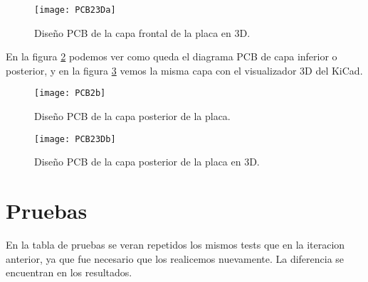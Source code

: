 \begin{figure}  [H]
\centering
  \texttt{[image: PCB23Da]}
  \caption{Diseño PCB de la capa frontal de la placa en 3D.}\label{fig:PCB23Da}
\end{figure}

En la figura \ref{fig:PCB2b} podemos ver como queda el diagrama PCB de capa inferior o posterior, y en la figura \ref{fig:PCB23Db} vemos la misma capa con el visualizador 3D del KiCad.

\begin{figure}[H] 
\centering
  \texttt{[image: PCB2b]}
  \caption{Diseño PCB de la capa posterior de la placa.}\label{fig:PCB2b}
\end{figure}

\begin{figure}  [H]
\centering
  \texttt{[image: PCB23Db]}
  \caption{Diseño PCB de la capa posterior de la placa en 3D.}\label{fig:PCB23Db}
\end{figure}



\section{Pruebas} %
\label{sec:pruebas}

En la tabla de pruebas se veran repetidos los mismos tests que en la iteracion anterior, ya que fue necesario que los realicemos nuevamente. La diferencia se encuentran en los resultados.

